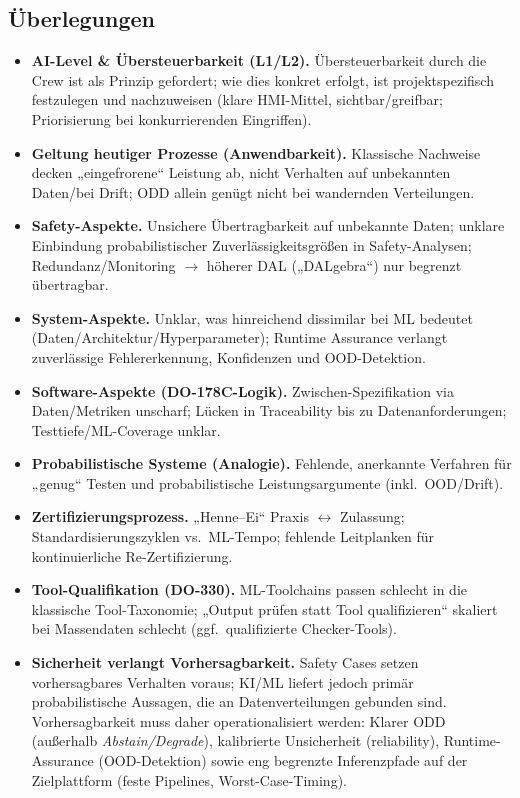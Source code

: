 \subsection{Überlegungen}
\begin{itemize}
  \item \textbf{AI-Level \& Übersteuerbarkeit (L1/L2).}
        Übersteuerbarkeit durch die Crew ist als Prinzip gefordert; wie dies konkret erfolgt, ist projektspezifisch festzulegen und nachzuweisen (klare HMI-Mittel, sichtbar/greifbar; Priorisierung bei konkurrierenden Eingriffen).
  \item \textbf{Geltung heutiger Prozesse (Anwendbarkeit).}
        Klassische Nachweise decken „eingefrorene“ Leistung ab, nicht Verhalten auf unbekannten Daten/bei Drift; ODD allein genügt nicht bei wandernden Verteilungen.
  \item \textbf{Safety-Aspekte.}
        Unsichere Übertragbarkeit auf unbekannte Daten; unklare Einbindung probabilistischer Zuverlässigkeitsgrößen in Safety-Analysen; Redundanz/Monitoring $\rightarrow$ höherer DAL („DALgebra“) nur begrenzt übertragbar.
  \item \textbf{System-Aspekte.}
        Unklar, was hinreichend dissimilar bei ML bedeutet (Daten/Architektur/Hyperparameter); Runtime Assurance verlangt zuverlässige Fehlererkennung, Konfidenzen und OOD-Detektion.
  \item \textbf{Software-Aspekte (DO-178C-Logik).}
        Zwischen-Spezifikation via Daten/Metriken unscharf; Lücken in Traceability bis zu Datenanforderungen; Testtiefe/ML-Coverage unklar.
  \item \textbf{Probabilistische Systeme (Analogie).}
        Fehlende, anerkannte Verfahren für „genug“ Testen und probabilistische Leistungsargumente (inkl.\ OOD/Drift).
  \item \textbf{Zertifizierungsprozess.}
        „Henne–Ei“ Praxis $\leftrightarrow$ Zulassung; Standardisierungszyklen vs.\ ML-Tempo; fehlende Leitplanken für kontinuierliche Re-Zertifizierung.
  \item \textbf{Tool-Qualifikation (DO-330).}
        ML-Toolchains passen schlecht in die klassische Tool-Taxonomie; „Output prüfen statt Tool qualifizieren“ skaliert bei Massendaten schlecht (ggf.\ qualifizierte Checker-Tools).
  \item \textbf{Sicherheit verlangt Vorhersagbarkeit.}
        Safety Cases setzen vorhersagbares Verhalten voraus; KI/ML liefert jedoch primär probabilistische Aussagen, die an Datenverteilungen gebunden sind. Vorhersagbarkeit muss daher operationalisiert werden: Klarer ODD (außerhalb \emph{Abstain/Degrade}), kalibrierte Unsicherheit (reliability), Runtime-Assurance (OOD-Detektion) sowie eng begrenzte Inferenzpfade auf der Zielplattform (feste Pipelines, Worst-Case-Timing).
\end{itemize}

